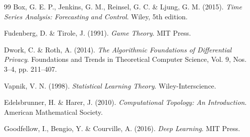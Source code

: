 \documentclass[12pt,a4paper,oneside]{scrartcl}
\begin{document}
\begin{thebibliography}{99}
		Box, G. E. P., Jenkins, G. M., Reinsel, G. C. \& Ljung, G. M. (2015). \textit{Time Series Analysis: Forecasting and Control}. Wiley, 5th edition.
		
		Fudenberg, D. \& Tirole, J. (1991). \textit{Game Theory}. MIT Press.
		
		Dwork, C. \& Roth, A. (2014). \textit{The Algorithmic Foundations of Differential Privacy}. Foundations and Trends in Theoretical Computer Science, Vol. 9, Nos. 3–4, pp. 211–407.
		
		Vapnik, V. N. (1998). \textit{Statistical Learning Theory}. Wiley-Interscience.
		
		Edelsbrunner, H. \& Harer, J. (2010). \textit{Computational Topology: An Introduction}. American Mathematical Society.
		
		Goodfellow, I., Bengio, Y. \& Courville, A. (2016). \textit{Deep Learning}. MIT Press.
		
	\end{thebibliography}
	
\end{document}
